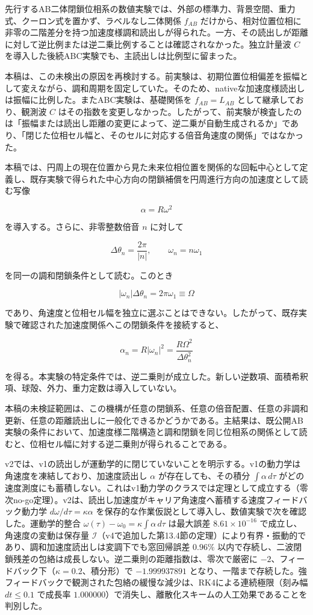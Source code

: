\documentclass[
  a4paper,
]{ltjsarticle}
\begin{document}
先行するAB二体閉鎖位相系の数値実験では、外部の標準力、背景空間、重力式、クーロン式を置かず、ラベルなし二体関係
\(f_{AB}\)
だけから、相対位置位相に非零の二階差分を持つ加速度様調和読出しが得られた。一方、その読出しが距離に対して逆比例または逆二乗比例することは確認されなかった。独立計量波
\(C\) を導入した後続ABC実験でも、主読出しは比例型に留まった。

本稿は、この未検出の原因を再検討する。前実験は、初期位置位相偏差を振幅として変えながら、調和周期を固定していた。そのため、nativeな加速度様読出しは振幅に比例した。またABC実験は、基礎関係を
\(f_{AB}=L_{AB}\) として継承しており、観測波 \(C\)
はその指数を変更しなかった。したがって、前実験が検査したのは「振幅または読出し距離の変更によって、逆二乗が自動生成されるか」であり、「閉じた位相セル幅と、そのセルに対応する倍音角速度の関係」ではなかった。

本稿では、円周上の現在位置から見た未来位相位置を関係的な回転中心として定義し、既存実験で得られた中心方向の閉鎖補償を円周進行方向の加速度として読む写像

\[
\alpha=R\omega^2
\]

を導入する。さらに、非零整数倍音 \(n\) に対して

\[
\Delta\theta_n=\frac{2\pi}{|n|},
\qquad
\omega_n=n\omega_1
\]

を同一の調和閉鎖条件として読む。このとき

\[
|\omega_n|\Delta\theta_n
=2\pi\omega_1
\equiv\Omega
\]

であり、角速度と位相セル幅を独立に選ぶことはできない。したがって、既存実験で確認された加速度関係へこの閉鎖条件を接続すると、

\[
\alpha_n
=R|\omega_n|^2
=\frac{R\Omega^2}{\Delta\theta_n^2}
\]

を得る。本実験の特定条件では、逆二乗則が成立した。新しい逆数項、面積希釈項、球殻、外力、重力定数は導入していない。

本稿の未検証範囲は、この機構が任意の閉鎖系、任意の倍音配置、任意の非調和更新、任意の距離読出しに一般化できるかどうかである。主結果は、既公開AB実験の条件において、加速度様二階構造と調和閉鎖を同じ位相系の関係として読むと、位相セル幅に対する逆二乗則が得られることである。

v2では、v1の読出しが運動学的に閉じていないことを明示する。v1の動力学は角速度を凍結しており、加速度読出し
\(\alpha\) が存在しても、その積分 \(\int\alpha\,d\tau\)
がどの速度測度にも蓄積しない。これはv1動力学のクラスでは定理として成立する（零次no-go定理）。v2は、読出し加速度がキャリア角速度へ蓄積する速度フィードバック動力学
\(d\omega/d\tau=\kappa\alpha\)
を保存的な作業仮説として導入し、数値実験で次を確認した。運動学的整合
\(\omega(\tau)-\omega_0=\kappa\int\alpha\,d\tau\) は最大誤差
\(8.61\times10^{-16}\) で成立し、角速度の変動は保存量
\(\mathcal I\)（v4で追加した第13.4節の定理）により有界・振動的であり、調和加速度読出しは変調下でも窓回帰誤差
\(0.96\%\)
以内で存続し、二波閉鎖残差の包絡は成長しない。逆二乗則の距離指数は、零次で厳密に
\(-2\)、フィードバック下（\(\kappa=0.2\)、積分形）で \(-1.999937891\)
となり、一階まで存続した。強フィードバックで観測された包絡の緩慢な減少は、RK4による連続極限（刻み幅
\(dt\le0.1\) で成長率
\(1.000000\)）で消失し、離散化スキームの人工効果であることを判別した。
\end{document}
